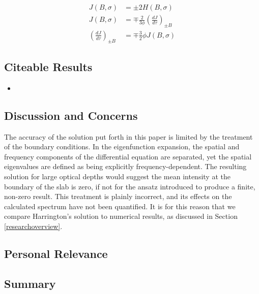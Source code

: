 \documentclass[onecolumn]{aastex63}
\begin{document}
\begin{equation}
    \begin{split}
        J(B, \sigma) &= \pm 2 H(B, \sigma) \\
        J(B, \sigma) &= \mp \frac{2}{3\phi}\left(\frac{dJ}{d\tau}\right)_{\pm B} \\
        \left(\frac{dJ}{d\tau}\right)_{\pm B} &= \mp \frac{3}{2}\phi J(B, \sigma)
    \end{split}
\end{equation}

\subsection{Citeable Results}
\begin{itemize}
    \item
\end{itemize}

\subsection{Discussion and Concerns}

The accuracy of the solution put forth in this paper is limited by the treatment of the boundary conditions. In the eigenfunction expansion, the spatial and frequency components of the differential equation are separated, yet the spatial eigenvalues are defined as being explicitly frequency-dependent. The resulting solution for large optical depths would suggest the mean intensity at the boundary of the slab is zero, if not for the ansatz introduced to produce a finite, non-zero result. This treatment is plainly incorrect, and its effects on the calculated spectrum have not been quantified. It is for this reason that we compare Harrington's solution to numerical results, as discussed in Section \ref{researchoverview}. 

\subsection{Personal Relevance}

\subsection{Summary}
\newpage
\end{document}
